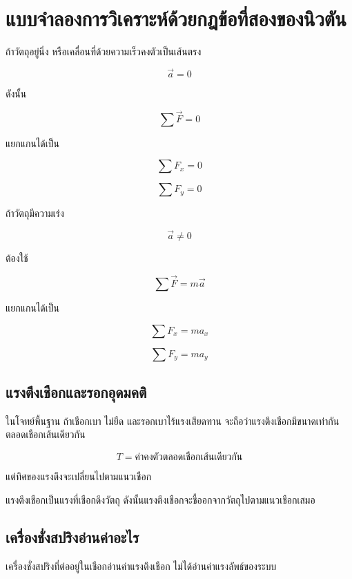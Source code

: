 \section{แบบจำลองการวิเคราะห์ด้วยกฎข้อที่สองของนิวตัน}


\begin{tcolorbox}[title=แบบจำลองที่ 1: อนุภาคสมดุล]
ถ้าวัตถุอยู่นิ่ง หรือเคลื่อนที่ด้วยความเร็วคงตัวเป็นเส้นตรง

\[
\vec{a}=0
\]

ดังนั้น

\[
\sum \vec{F}=0
\]

แยกแกนได้เป็น

\[
\sum F_x=0
\]

\[
\sum F_y=0
\]
\end{tcolorbox}

\begin{tcolorbox}[title=แบบจำลองที่ 2: อนุภาคภายใต้แรงลัพธ์]
ถ้าวัตถุมีความเร่ง

\[
\vec{a}\neq 0
\]

ต้องใช้

\[
\sum \vec{F}=m\vec{a}
\]

แยกแกนได้เป็น

\[
\sum F_x=ma_x
\]

\[
\sum F_y=ma_y
\]
\end{tcolorbox}

\subsection{แรงตึงเชือกและรอกอุดมคติ}

ในโจทย์พื้นฐาน ถ้าเชือกเบา ไม่ยืด และรอกเบาไร้แรงเสียดทาน จะถือว่าแรงตึงเชือกมีขนาดเท่ากันตลอดเชือกเส้นเดียวกัน

\[
T=\text{ค่าคงตัวตลอดเชือกเส้นเดียวกัน}
\]

แต่ทิศของแรงตึงจะเปลี่ยนไปตามแนวเชือก

\begin{tcolorbox}[title=ข้อควรจำ]
แรงตึงเชือกเป็นแรงที่เชือกดึงวัตถุ ดังนั้นแรงตึงเชือกจะชี้ออกจากวัตถุไปตามแนวเชือกเสมอ
\end{tcolorbox}

\subsection{เครื่องชั่งสปริงอ่านค่าอะไร}

เครื่องชั่งสปริงที่ต่ออยู่ในเชือกอ่านค่าแรงตึงเชือก ไม่ได้อ่านค่าแรงลัพธ์ของระบบ

